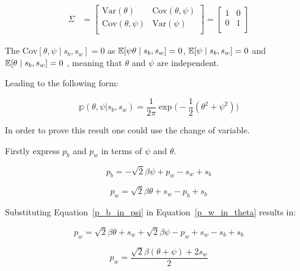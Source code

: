 \documentclass[a4paper,11pt]{article}
\theoremstyle{mytheor}
\newcommand{\E}{\Bbb{E}}
\newcommand{\Var}{\mathrm{Var}}
\newcommand{\Cov}{\mathrm{Cov}}
\begin{document}
\begin{align}
    \label{vec_theta_psi_cov_mat}
    \Sigma &= \begin{bmatrix}
           \Var(\theta) & \Cov(\theta,\psi)\\
           \Cov(\theta,\psi) & \Var(\psi) \\
         \end{bmatrix} = \begin{bmatrix}
                            1 & 0 \\
                            0 & 1 \\
                          \end{bmatrix}
\end{align}

The $\Cov[\theta,\psi \mid s_b,s_w]=0$ as $\E[\psi\theta \mid s_b,s_w]=0$, $\E[\psi \mid s_b,s_w]=0$ and $\E[\theta \mid s_b,s_w]=0$ , meaning that $\theta$ and $\psi$ are independent.

Leading to the following form:
  
\begin{equation}
    \label{p_psi_theta}
    \mathbb{p}(\theta,\psi|s_b,s_w)= \frac{1}{2\pi}\exp \Big( -\frac{1}{2}(\theta^2+\psi^2) \Big)
\end{equation}

In order to prove this result one could use the change of variable.

Firstly express $p_b$ and $p_w$ in terms of $\psi$ and $\theta$.

\begin{equation}
    \label{p_b_in_psi}
    p_b = -\sqrt{2}\beta\psi + p_w - s_w + s_b
\end{equation}

\begin{equation}
    \label{p_w_in_theta}
    p_w = \sqrt{2}\beta\theta + s_w - p_b + s_b
\end{equation}

Substituting Equation~\ref{p_b_in_psi} in Equation~\ref{p_w_in_theta} results in:

\begin{equation}
    \label{p_b_in_p_w}
    p_w = \sqrt{2}\beta\theta + s_w + \sqrt{2}\beta\psi - p_w + s_w - s_b + s_b
\end{equation}

\begin{equation}
    \label{p_b_in_p_w_2}
    p_w = \frac{\sqrt{2}\beta(\theta+\psi) + 2s_w}{2}
\end{equation}
\end{document}
